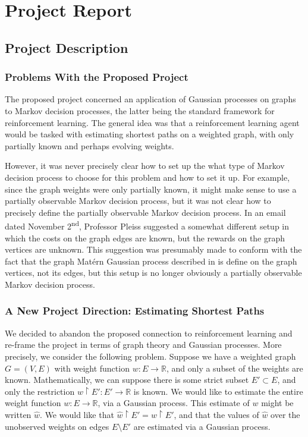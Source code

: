 

\section{Project Report}

\subsection{Project Description}

\subsubsection{Problems With the Proposed Project}

The proposed project concerned an application of Gaussian processes on graphs to Markov decision processes, the latter being the standard framework for reinforcement learning. The general idea was that a reinforcement learning agent would be tasked with estimating shortest paths on a weighted graph, with only partially known and perhaps evolving weights.

However, it was never precisely clear how to set up the what type of Markov decision process to choose for this problem and how to set it up. For example, since the graph weights were only partially known, it might make sense to use a partially observable Markov decision process, but it was not clear how to precisely define the partially observable Markov decision process. In an email dated November 2\textsuperscript{nd}, Professor Pleiss suggested a somewhat different setup in which the costs on the graph edges are known, but the rewards on the graph vertices are unknown. This suggestion was presumably made to conform with the fact that the graph Mat\'{e}rn Gaussian process described in \cite{pmlr-v130-borovitskiy21a} is define on the graph vertices, not its edges, but this setup is no longer obviously a partially observable Markov decision process.

\subsubsection{A New Project Direction: Estimating Shortest Paths}

We decided to abandon the proposed connection to reinforcement learning and re-frame the project in terms of graph theory and Gaussian processes. More precisely, we consider the following problem. Suppose we have a weighted graph $G = (V, E)$ with weight function $w \colon E \to \mathbb R$, and only a subset of the weights are known. Mathematically, we can suppose there is some strict subset $E' \subset E$, and only the restriction $w \restriction E' \colon E' \to \mathbb R$ is known. We would like to estimate the entire weight function $w \colon E \to \mathbb R$, via a Gaussian process. This estimate of $w$ might be written $\hat w$. We would like that $\hat w \restriction E' = w \restriction E'$, and that the values of $\hat w$ over the unobserved weights on edges $E \setminus E'$ are estimated via a Gaussian process.

